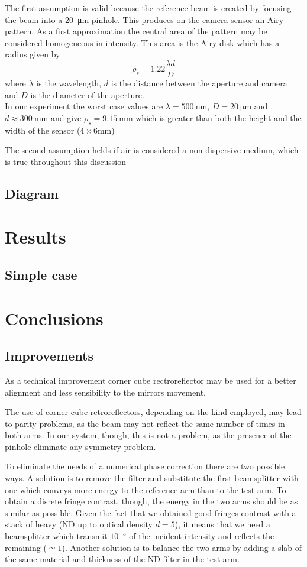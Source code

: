 \documentclass[12pt,a4paper,twoside]{article}
\begin{document}
The first assumption is valid because the reference beam is created by focusing the beam into a \SI{20}{\um} pinhole.
This produces on the camera sensor an Airy pattern.
As a first approximation the central area of the pattern may be considered homogeneous in intensity.
This area is the Airy disk which has a radius given by
$$\rho_s = 1.22 \frac{\lambda d}{D}$$
where $\lambda$ is the wavelength, $d$ is the distance between the aperture and camera and $D$ is the diameter of the aperture.\\
In our experiment the worst case values are $\lambda = \SI{500}{\nm}$, $D = \SI{20}{\um}$ and $d \approx \SI{300}{\mm}$ and give $\rho_s = \SI{9.15}{\mm}$ which is greater than both the height and the width of the sensor ($4 \times 6 \si{\mm}$)

The second assumption helds if air is considered a non dispersive medium, which is true throughout this discussion
\subsection{Diagram}
\section{Results}
\subsection{Simple case}
\section{Conclusions}
\subsection{Improvements}
As a technical improvement corner cube rectroreflector may be used for a better alignment and less sensibility to the mirrors movement.

The use of corner cube retroreflectors, depending on the kind employed, may lead to parity problems, as the beam may not reflect the same number of times in both arms.
In our system, though, this is not a problem, as the presence of the pinhole eliminate any symmetry problem.

To eliminate the needs of a numerical phase correction there are two possible ways.
A solution is to remove the filter and substitute the first beamsplitter with one which conveys more energy to the reference arm than to the test arm.
To obtain a disrete fringe contrast, though, the energy in the two arms should be as similar as possible.
Given the fact that we obtained good fringes contrast with a stack of heavy (ND up to optical density $d=5$), it means that we need a beamsplitter which transmit $10^{-5}$ of the incident intensity and reflects the remaining ($\simeq 1$).
Another solution is to balance the two arms by adding a slab of the same material and thickness of the ND filter in the test arm.
\end{document}
